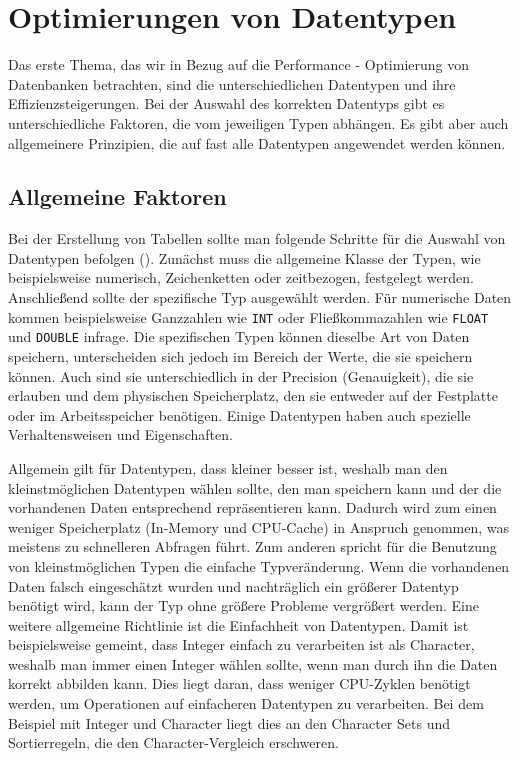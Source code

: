 
\chapter{Optimierungen von Datentypen}\label{ch:data-types-optimierungen-von-datentypen}

Das erste Thema, das wir in Bezug auf die Performance - Optimierung von Datenbanken betrachten, sind die unterschiedlichen Datentypen und ihre Effizienzsteigerungen.
Bei der Auswahl des korrekten Datentyps gibt es unterschiedliche Faktoren, die vom jeweiligen Typen abhängen.
Es gibt aber auch allgemeinere Prinzipien, die auf fast alle Datentypen angewendet werden können.

\section{Allgemeine Faktoren}\label{sec:data-types-allgemeine-faktoren}

Bei der Erstellung von Tabellen sollte man folgende Schritte für die Auswahl von Datentypen befolgen (\cite[pp. 115--145]{schwartz2012high}).
Zunächst muss die allgemeine Klasse der Typen, wie beispielsweise numerisch, Zeichenketten oder zeitbezogen, festgelegt werden.
Anschließend sollte der spezifische Typ ausgewählt werden.
Für numerische Daten kommen beispielsweise Ganzzahlen wie \texttt{INT} oder Fließkommazahlen wie \texttt{FLOAT} und \texttt{DOUBLE} infrage.
Die spezifischen Typen können dieselbe Art von Daten speichern, unterscheiden sich jedoch im Bereich der Werte, die sie speichern können.
Auch sind sie unterschiedlich in der Precision (Genauigkeit), die sie erlauben und dem physischen Speicherplatz, den sie entweder auf der Festplatte oder im Arbeitsspeicher benötigen.
Einige Datentypen haben auch spezielle Verhaltensweisen und Eigenschaften.

Allgemein gilt für Datentypen, dass kleiner besser ist, weshalb man den kleinstmöglichen Datentypen wählen sollte, den man speichern kann und der die vorhandenen Daten entsprechend repräsentieren kann.
Dadurch wird zum einen weniger Speicherplatz (In-Memory und CPU-Cache) in Anspruch genommen, was meistens zu schnelleren Abfragen führt.
Zum anderen spricht für die Benutzung von kleinstmöglichen Typen die einfache Typveränderung.
Wenn die vorhandenen Daten falsch eingeschätzt wurden und nachträglich ein größerer Datentyp benötigt wird, kann der Typ ohne größere Probleme vergrößert werden.
Eine weitere allgemeine Richtlinie ist die Einfachheit von Datentypen.
Damit ist beispielsweise gemeint, dass Integer einfach zu verarbeiten ist als Character, weshalb man immer einen Integer wählen sollte, wenn man durch ihn die Daten korrekt abbilden kann.
Dies liegt daran, dass weniger CPU-Zyklen benötigt werden, um Operationen auf einfacheren Datentypen zu verarbeiten.
Bei dem Beispiel mit Integer und Character liegt dies an den Character Sets und Sortierregeln, die den Character-Vergleich erschweren.

